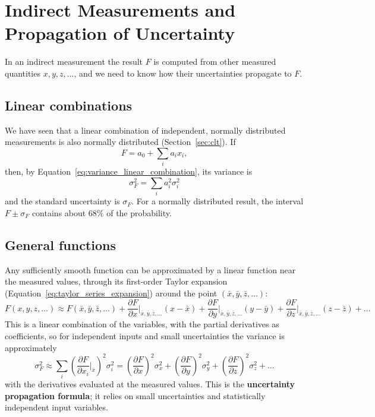\documentclass[letterpaper,11pt,leqno]{book}
\begin{document}
\section{Indirect Measurements and Propagation of Uncertainty}
\label{sec:indirect}

In an indirect measurement the result $F$ is computed from other measured quantities $x, y, z, \dots$, and we need to know how their uncertainties propagate to $F$.

\subsection{Linear combinations}

We have seen that a linear combination of independent, normally distributed measurements is also normally distributed (Section~\ref{sec:clt}). If
\begin{equation}
F = a_0 + \sum_i a_ix_i,
\end{equation}
then, by Equation~\eqref{eq:variance_linear_combination}, its variance is
\begin{equation}
\boxed{\sigma_F^2 = \sum_i a_i^2\sigma_i^2}
\label{eq:propagation_linear}
\end{equation}
and the standard uncertainty is $\sigma_F$. For a normally distributed result, the interval $F \pm \sigma_F$ contains about 68\% of the probability.

\subsection{General functions}

Any sufficiently smooth function can be approximated by a linear function near the measured values, through its first-order Taylor expansion (Equation~\eqref{eq:taylor_series_expansion}) around the point $(\bar{x}, \bar{y}, \bar{z}, \dots)$:
\begin{equation}
F(x, y, z, \dots) \approx F(\bar{x}, \bar{y}, \bar{z}, \dots) + \frac{\partial F}{\partial x}\bigg|_{\bar{x},\bar{y},\bar{z},\dots}(x - \bar{x}) + \frac{\partial F}{\partial y}\bigg|_{\bar{x},\bar{y},\bar{z},\dots}(y - \bar{y}) + \frac{\partial F}{\partial z}\bigg|_{\bar{x},\bar{y},\bar{z},\dots}(z - \bar{z}) + \dots
\end{equation}
This is a linear combination of the variables, with the partial derivatives as coefficients, so for independent inputs and small uncertainties the variance is approximately
\begin{equation}
\boxed{\sigma_F^2 \approx \sum_i\left(\frac{\partial F}{\partial x_i}\bigg|_{\bar{x}}\right)^2\sigma_i^2 = \left(\frac{\partial F}{\partial x}\right)^2\sigma_x^2 + \left(\frac{\partial F}{\partial y}\right)^2\sigma_y^2 + \left(\frac{\partial F}{\partial z}\right)^2\sigma_z^2 + \dots}
\label{eq:propagation_general}
\end{equation}
with the derivatives evaluated at the measured values. This is the \textbf{uncertainty propagation formula}; it relies on small uncertainties and statistically independent input variables.
\end{document}
